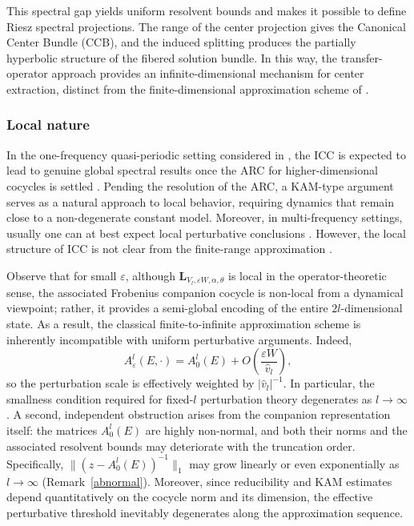 \documentclass[reqno,11pt]{amsart}
\begin{document}
This spectral gap yields uniform resolvent bounds and makes it possible to define Riesz spectral projections. The range of the center projection gives the Canonical Center Bundle (CCB), and the induced splitting produces the partially hyperbolic structure of the fibered solution bundle. In this way, the transfer-operator approach provides an infinite-dimensional mechanism for center extraction, distinct from the finite-dimensional approximation scheme of \cite{GJ}.

\subsubsection{Local nature}

In the one-frequency quasi-periodic setting considered in \cite{GJ}, the ICC is expected to lead to genuine global spectral results once the ARC for higher-dimensional cocycles is settled \cite{You}. Pending the resolution of the ARC, a KAM-type argument serves as a natural approach to local behavior, requiring dynamics that remain close to a non-degenerate constant model. Moreover, in multi-frequency settings, usually one can at best expect local perturbative conclusions \cite{Bou02a,Bou02b}. However, the local structure of ICC is not clear from the finite-range approximation \cite{GJ}. 

Observe that for small $\varepsilon$, although $\mathbf L_{V_l,\varepsilon W,\alpha,\theta}$ is local in the operator-theoretic sense, the associated Frobenius companion cocycle is non-local from a dynamical viewpoint; rather, it provides a semi-global encoding \cite{YZh} of the entire $2l$-dimensional state. As a result, the classical finite-to-infinite approximation scheme is inherently incompatible with uniform perturbative arguments. Indeed,$$A_{\varepsilon}^{l}(E,\cdot)=A_{0}^{l}(E)+O\!\left(\frac{\varepsilon W}{\hat v_l}\right),$$so the perturbation scale is effectively weighted by $|\hat v_l|^{-1}$. In particular, the smallness condition required for fixed-$l$ perturbation theory degenerates as $l\to\infty$. A second, independent obstruction arises from the companion representation itself: the matrices $A_0^l(E)$ are highly non-normal, and both their norms and the associated resolvent bounds may deteriorate with the truncation order. Specifically, $\|(z-A_0^l(E))^{-1}\|_1$ may grow linearly or even exponentially as $l\to\infty$ (Remark~\ref{abnormal}). Moreover, since reducibility and KAM estimates depend quantitatively on the cocycle norm and its dimension, the effective perturbative threshold inevitably degenerates along the approximation sequence.
\end{document}
